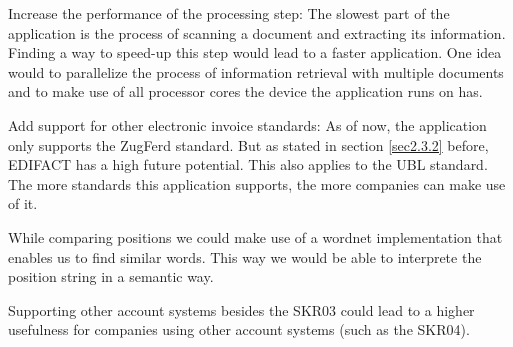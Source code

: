 Increase the performance of the processing step: The slowest part of the application is the process of scanning a document and extracting its information. Finding a way to speed-up this step would lead to a faster application. One idea would to parallelize the process of information retrieval with multiple documents and to make use of all processor cores the device the application runs on has.

Add support for other electronic invoice standards: As of now, the application only supports the ZugFerd standard. But as stated in section \ref{sec2.3.2} before, EDIFACT has a high future potential. This also applies to the UBL standard. The more standards this application supports, the more companies can make use of it.

While comparing positions we could make use of a wordnet implementation that enables us to find similar words. This way we would be able to interprete the position string in a semantic way.

Supporting other account systems besides the SKR03 could lead to a higher usefulness for companies using other account systems (such as the SKR04).